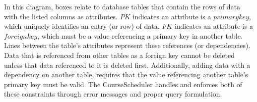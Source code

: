 \documentclass[a4paper,12pt]{article}
\begin{document}
In this diagram, boxes relate to database tables that contain the rows of data with the listed columns as attributes. $PK$ indicates an attribute is a $primary key$, which uniquely identifies an entry (or row) of data. $FK$ indicates an attribute is a $foreign key$, which must be a value referencing a primary key in another table. Lines between the table's attributes represent these references (or dependencies). Data that is referenced from other tables as a foreign key cannot be deleted unless that data referenced to it is deleted first. Additionally, adding data with a dependency on another table, requires that the value referencing another table's primary key must be valid. The CourseScheduler handles and enforces both of these constraints through error messages and proper query formulation.
\end{document}
